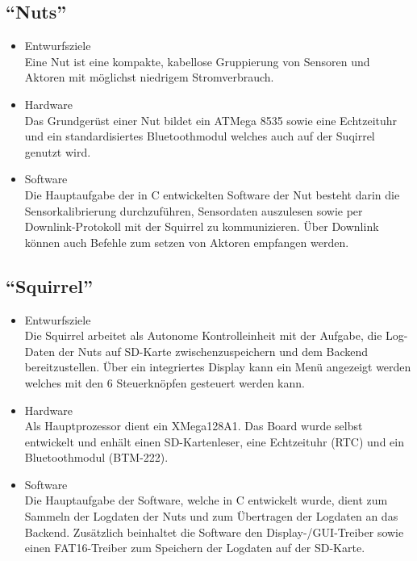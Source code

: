 \documentclass[12pt,a4paper]{article}
\begin{document}
\subsection{``Nuts''}
\begin{itemize}
	\item Entwurfsziele\\
	Eine Nut ist eine kompakte, kabellose Gruppierung von Sensoren und Aktoren mit möglichst niedrigem Stromverbrauch.
	\item Hardware\\
	Das Grundgerüst einer Nut bildet ein ATMega 8535 sowie eine Echtzeituhr und ein standardisiertes Bluetoothmodul welches auch auf der Suqirrel genutzt wird.
	\item Software\\
	Die Hauptaufgabe der in C entwickelten Software der Nut besteht darin die Sensorkalibrierung durchzuführen, Sensordaten auszulesen sowie per Downlink-Protokoll mit der Squirrel zu kommunizieren. Über Downlink können auch Befehle zum setzen von Aktoren empfangen werden.
\end{itemize}
\subsection{``Squirrel''}
\begin{itemize}
	\item Entwurfsziele\\
	Die Squirrel arbeitet als Autonome Kontrolleinheit mit der Aufgabe, die Log-Daten der Nuts auf SD-Karte zwischenzuspeichern und dem Backend bereitzustellen. Über ein integriertes Display kann ein Menü angezeigt werden welches mit den 6 Steuerknöpfen gesteuert werden kann.
	\item Hardware\\
	Als Hauptprozessor dient ein XMega128A1. Das Board wurde selbst entwickelt und enhält einen SD-Kartenleser, eine Echtzeituhr (RTC) und ein Bluetoothmodul (BTM-222).
	\item Software\\
	Die Hauptaufgabe der Software, welche in C entwickelt wurde, dient zum Sammeln der Logdaten der Nuts und zum Übertragen der Logdaten an das Backend. Zusätzlich beinhaltet die Software den Display-/GUI-Treiber sowie einen FAT16-Treiber zum Speichern der Logdaten auf der SD-Karte.
\end{itemize}
\end{document}
